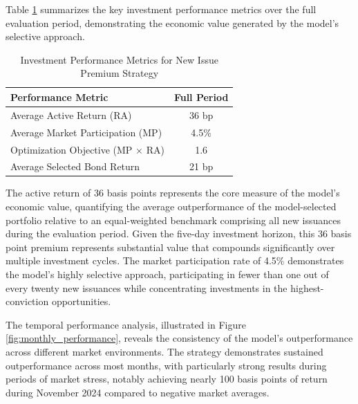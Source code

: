 Table \ref{tab:backtest_performance} summarizes the key investment performance metrics over the full evaluation period, demonstrating the economic value generated by the model's selective approach.

\begin{table}[htbp]
\centering
\caption{Investment Performance Metrics for New Issue Premium Strategy}
\label{tab:backtest_performance}
\begin{tabular}{lc}
\hline
\textbf{Performance Metric} & \textbf{Full Period} \\
\hline
Average Active Return (RA) & 36 bp \\
Average Market Participation (MP) & 4.5\% \\
Optimization Objective (MP $\times$ RA) & 1.6 \\
Average Selected Bond Return & 21 bp \\
\hline
\end{tabular}
\end{table}

The active return of 36 basis points represents the core measure of the model's economic value, quantifying the average outperformance of the model-selected portfolio relative to an equal-weighted benchmark comprising all new issuances during the evaluation period. Given the five-day investment horizon, this 36 basis point premium represents substantial value that compounds significantly over multiple investment cycles. The market participation rate of 4.5\% demonstrates the model's highly selective approach, participating in fewer than one out of every twenty new issuances while concentrating investments in the highest-conviction opportunities.

The temporal performance analysis, illustrated in Figure \ref{fig:monthly_performance}, reveals the consistency of the model's outperformance across different market environments. The strategy demonstrates sustained outperformance across most months, with particularly strong results during periods of market stress, notably achieving nearly 100 basis points of return during November 2024 compared to negative market averages.


